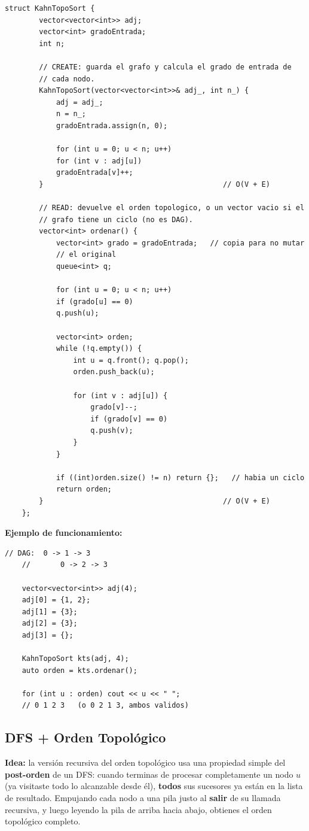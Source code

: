 \documentclass[10pt,a4paper,twocolumn]{article}
\begin{document}
\begin{lstlisting}[style=cpp]
	struct KahnTopoSort {
		vector<vector<int>> adj;
		vector<int> gradoEntrada;
		int n;
		
		// CREATE: guarda el grafo y calcula el grado de entrada de
		// cada nodo.
		KahnTopoSort(vector<vector<int>>& adj_, int n_) {
			adj = adj_;
			n = n_;
			gradoEntrada.assign(n, 0);
			
			for (int u = 0; u < n; u++)
			for (int v : adj[u])
			gradoEntrada[v]++;
		}                                          // O(V + E)
		
		// READ: devuelve el orden topologico, o un vector vacio si el
		// grafo tiene un ciclo (no es DAG).
		vector<int> ordenar() {
			vector<int> grado = gradoEntrada;   // copia para no mutar
			// el original
			queue<int> q;
			
			for (int u = 0; u < n; u++)
			if (grado[u] == 0)
			q.push(u);
			
			vector<int> orden;
			while (!q.empty()) {
				int u = q.front(); q.pop();
				orden.push_back(u);
				
				for (int v : adj[u]) {
					grado[v]--;
					if (grado[v] == 0)
					q.push(v);
				}
			}
			
			if ((int)orden.size() != n) return {};   // habia un ciclo
			return orden;
		}                                          // O(V + E)
	};
\end{lstlisting}

\textbf{Ejemplo de funcionamiento:}

\begin{lstlisting}[style=cpp]
	// DAG:  0 -> 1 -> 3
	//       0 -> 2 -> 3
	
	vector<vector<int>> adj(4);
	adj[0] = {1, 2};
	adj[1] = {3};
	adj[2] = {3};
	adj[3] = {};
	
	KahnTopoSort kts(adj, 4);
	auto orden = kts.ordenar();
	
	for (int u : orden) cout << u << " ";
	// 0 1 2 3   (o 0 2 1 3, ambos validos)
\end{lstlisting}


\subsection{DFS + Orden Topológico}

\textbf{Idea:} la versión recursiva del orden topológico usa una
propiedad simple del \textbf{post-orden} de un DFS: cuando terminas
de procesar completamente un nodo $u$ (ya visitaste todo lo
alcanzable desde él), \textbf{todos} sus sucesores ya están en la
lista de resultado. Empujando cada nodo a una pila justo al
\textbf{salir} de su llamada recursiva, y luego leyendo la pila de
arriba hacia abajo, obtienes el orden topológico completo.
\end{document}
